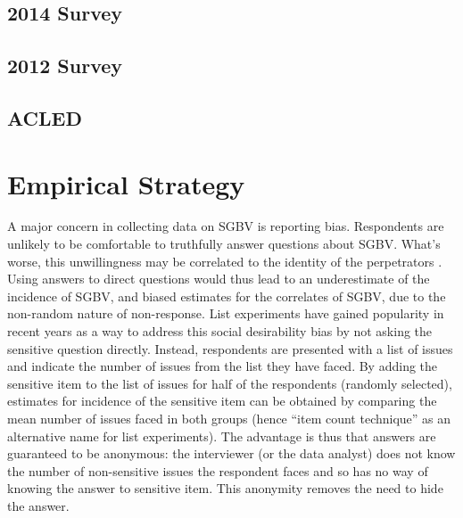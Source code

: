 \documentclass[10pt,a4paper,abstract=on]{scrartcl} %
\begin{document}
\subsection{2014 Survey}

\subsection{2012 Survey}

\subsection{ACLED}

\section*{Empirical Strategy}
A major concern in collecting data on SGBV is reporting bias. Respondents are unlikely to be comfortable to truthfully answer questions about SGBV. What's worse, this unwillingness may be correlated to the identity of the perpetrators \citep{Stark2017}. Using answers to direct questions would thus lead to an underestimate of the incidence of SGBV, and biased estimates for the correlates of SGBV, due to the non-random nature of non-response. List experiments have gained popularity in recent years as a way to address this social desirability bias by not asking the sensitive question directly. Instead, respondents are presented with a list of issues and indicate the number of issues from the list they have faced. By adding the sensitive item to the list of issues for half of the respondents (randomly selected), estimates for incidence of the sensitive item can be obtained by comparing the mean number of issues faced in both groups (hence ``item count technique'' as an alternative name for list experiments). The advantage is thus that answers are guaranteed to be anonymous: the interviewer (or the data analyst) does not know the number of non-sensitive issues the respondent faces and so has no way of knowing the answer to sensitive item. This anonymity removes the need to hide the answer. 
\end{document}
